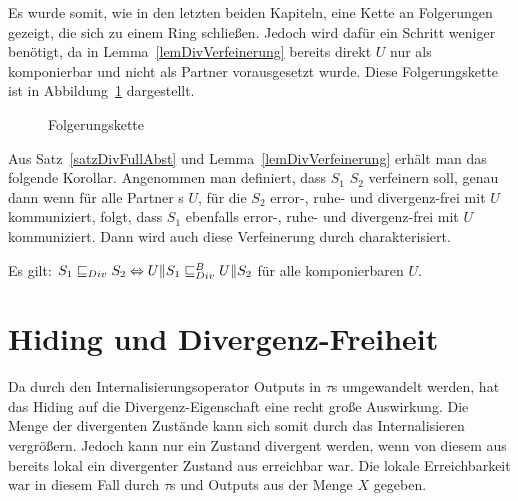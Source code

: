Es wurde somit, wie in den letzten beiden Kapiteln, eine Kette an Folgerungen
gezeigt, die sich zu einem Ring schließen. Jedoch wird dafür ein Schritt
weniger benötigt, da in Lemma~\ref{lemDivVerfeinerung} bereits direkt $U$ nur
als komponierbar und nicht als Partner vorausgesetzt wurde. Diese
Folgerungskette ist in Abbildung~\ref{FolgerungsketteDiv} dargestellt.

\begin{figure}[h!tbp]
  \begin{center}
    \caption{Folgerungskette}
\label{FolgerungsketteDiv}
  \end{center}
\end{figure}

Aus Satz~\ref{satzDivFullAbst} und Lemma~\ref{lemDivVerfeinerung} erhält man
das folgende Korollar. Angenommen man definiert, dass $S_1$ $S_2$ verfeinern
soll, genau dann wenn für alle Partner \EIO{}s $U$, für die $S_2$ error-, ruhe-
und divergenz-frei mit $U$ kommuniziert, folgt, dass $S_1$ ebenfalls error-,
ruhe- und divergenz-frei mit $U$ kommuniziert. Dann wird auch diese
Verfeinerung durch \DRel{} charakterisiert.

\begin{kor}
  Es gilt: $S_1\sqsubseteq _{Div}{} S_2 \Leftrightarrow U\|S_1\sqsubseteq _{Div}^B{} U\|S_2$ für alle
  komponierbaren $U$.
\end{kor}

\section{Hiding und Divergenz-Freiheit}

Da durch den Internalisierungsoperator Outputs in $\tau$s umgewandelt werden,
hat das Hiding auf die Divergenz-Eigenschaft eine recht große Auswirkung. Die
Menge der divergenten Zustände kann sich somit durch das Internalisieren
vergrößern. Jedoch kann nur ein Zustand divergent werden, wenn von diesem aus
bereits lokal ein divergenter Zustand aus erreichbar war. Die lokale
Erreichbarkeit war in diesem Fall durch $\tau$s und Outputs aus der Menge $X$
gegeben.
